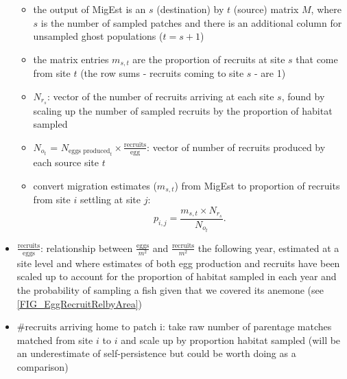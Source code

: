 \documentclass[12pt, oneside]{article}   	%
\begin{document}
\begin{itemize}
\begin{itemize}
			\item the output of MigEst is an $s$ (destination) by $t$ (source) matrix $M$, where $s$ is the number of sampled patches and there is an additional column for unsampled ghost populations ($t = s+1$)
			\item the matrix entries $m_{s,t}$ are the proportion of recruits at site $s$ that come from site $t$ (the row sums - recruits coming to site $s$ - are 1)
			\item $N_{r_s}$: vector of the number of recruits arriving at each site $s$, found by scaling up the number of sampled recruits by the proportion of habitat sampled
			\item $N_{o_t}$ = $N_{\text{eggs produced}_t} \times \frac{\text{recruits}}{\text{egg}}$: vector of number of recruits produced by each source site $t$
			\item convert migration estimates ($m_{s,t}$) from MigEst to proportion of recruits from site $i$ settling at site $j$:
			\begin{equation}
			p_{i,j} = \frac{m_{s,t} \times N_{r_s}}{N_{o_t}}. \label{PijfromMigEst}
			\end{equation}
		\end{itemize}
	\item $\frac{\text{recruits}}{\text{eggs}}$: relationship between $\frac{\text{eggs}}{m^2}$ and $\frac{\text{recruits}}{m^2}$ the following year, estimated at a site level and where estimates of both egg production and recruits have been scaled up to account for the proportion of habitat sampled in each year and the probability of sampling a fish given that we covered its anemone (see \ref{FIG_EggRecruitRelbyArea})
	\item $\# \text{recruits arriving home to patch i}$: take raw number of parentage matches matched from site $i$ to $i$ and scale up by proportion habitat sampled (will be an underestimate of self-persistence but could be worth doing as a comparison)


\end{itemize}
\end{document}
